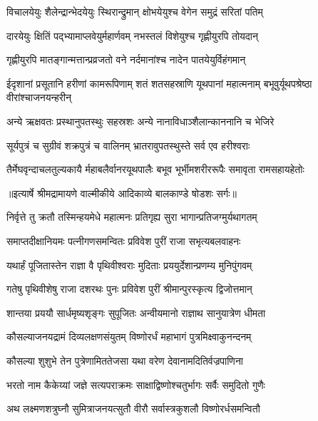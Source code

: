 \twolineshloka
{विचालयेयुः शैलेन्द्रान्भेदयेयुः स्थिरान्द्रुमान्}
{क्षोभयेयुश्च वेगेन समुद्रं सरितां पतिम्} %

\twolineshloka
{दारयेयुः क्षितिं पद्भ्यामाप्लवेयुर्महार्णवम्}
{नभस्तलं विशेयुश्च गृह्णीयुरपि तोयदान्} %

\twolineshloka
{गृह्णीयुरपि मातङ्गान्मत्तान्प्रव्रजतो वने}
{नर्दमानांश्च नादेन पातयेयुर्विहंगमान्} %

\threelineshloka
{ईदृशानां प्रसूतानि हरीणां कामरूपिणाम्}
{शतं शतसहस्राणि यूथपानां महात्मनाम्}
{बभूवुर्यूथपश्रेष्ठा वीरांश्चाजनयन्हरीन्} %

\twolineshloka
{अन्ये ऋक्षवतः प्रस्थानुपतस्थुः सहस्रशः}
{अन्ये नानाविधाञ्शैलान्काननानि च भेजिरे} %

\twolineshloka
{सूर्यपुत्रं च सुग्रीवं शक्रपुत्रं च वालिनम्}
{भ्रातरावुपतस्थुस्ते सर्व एव हरीश्वराः} %

\fourlineindentedshloka
{तैर्मेघवृन्दाचलतुल्यकायै}
{र्महाबलैर्वानरयूथपालैः}
{बभूव भूर्भीमशरीररूपैः}
{ समावृता रामसहायहेतोः} %


{॥इत्यार्षे श्रीमद्रामायणे वाल्मीकीये आदिकाव्ये बालकाण्डे षोडशः सर्गः॥}


\twolineshloka
{निर्वृत्ते तु क्रतौ तस्मिन्हयमेधे महात्मनः}
{प्रतिगृह्य सुरा भागान्प्रतिजग्मुर्यथागतम्} %

\twolineshloka
{समाप्तदीक्षानियमः पत्नीगणसमन्वितः}
{प्रविवेश पुरीं राजा सभृत्यबलवाहनः} %

\twolineshloka
{यथार्हं पूजितास्तेन राज्ञा वै पृथिवीश्वराः}
{मुदिताः प्रययुर्देशान्प्रणम्य मुनिपुंगवम्} %

\twolineshloka
{गतेषु पृथिवीशेषु राजा दशरथः पुनः}
{प्रविवेश पुरीं श्रीमान्पुरस्कृत्य द्विजोत्तमान्} %

\twolineshloka
{शान्तया प्रययौ सार्धमृष्यशृङ्गः सुपूजितः}
{अन्वीयमानो राज्ञाथ सानुयात्रेण धीमता} %

\twolineshloka
{कौसल्याजनयद्रामं दिव्यलक्षणसंयुतम्}
{विष्णोरर्धं महाभागं पुत्रमिक्ष्वाकुनन्दनम्} %

\twolineshloka
{कौसल्या शुशुभे तेन पुत्रेणामिततेजसा}
{यथा वरेण देवानामदितिर्वज्रपाणिना} %

\twolineshloka
{भरतो नाम कैकेय्यां जज्ञे सत्यपराक्रमः}
{साक्षाद्विष्णोश्चतुर्भागः सर्वैः समुदितो गुणैः} %

\twolineshloka
{अथ लक्ष्मणशत्रुघ्नौ सुमित्राजनयत्सुतौ}
{वीरौ सर्वास्त्रकुशलौ विष्णोरर्धसमन्वितौ} %

